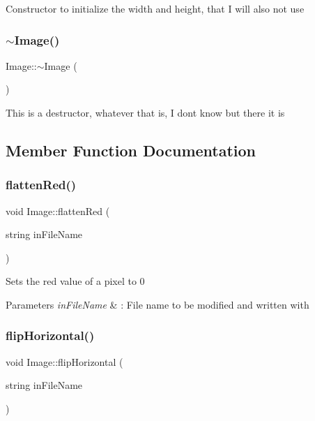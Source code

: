 Constructor to initialize the width and height, that I will also not use \mbox{\label{classImage_a0294f63700543e11c0f0da85601c7ae5}} 
\subsubsection{\texorpdfstring{$\sim$\+Image()}{~Image()}}
{\footnotesize\ttfamily Image\+::$\sim$\+Image (\begin{DoxyParamCaption}{ }\end{DoxyParamCaption})}

This is a destructor, whatever that is, I don\textquotesingle{}t know but there it is 

\subsection{Member Function Documentation}
\mbox{\label{classImage_a71d4559ee2624869ab91e1939ee261aa}} 
\subsubsection{\texorpdfstring{flatten\+Red()}{flattenRed()}}
{\footnotesize\ttfamily void Image\+::flatten\+Red (\begin{DoxyParamCaption}\item[{string}]{in\+File\+Name }\end{DoxyParamCaption})}

Sets the red value of a pixel to 0 
\begin{DoxyParams}{Parameters}
{\em in\+File\+Name} & \+: File name to be modified and written with \\
\hline
\end{DoxyParams}
\mbox{\label{classImage_af02638aea2fda9609af2ef9f3f9dbc3b}} 
\subsubsection{\texorpdfstring{flip\+Horizontal()}{flipHorizontal()}}
{\footnotesize\ttfamily void Image\+::flip\+Horizontal (\begin{DoxyParamCaption}\item[{string}]{in\+File\+Name }\end{DoxyParamCaption})}

